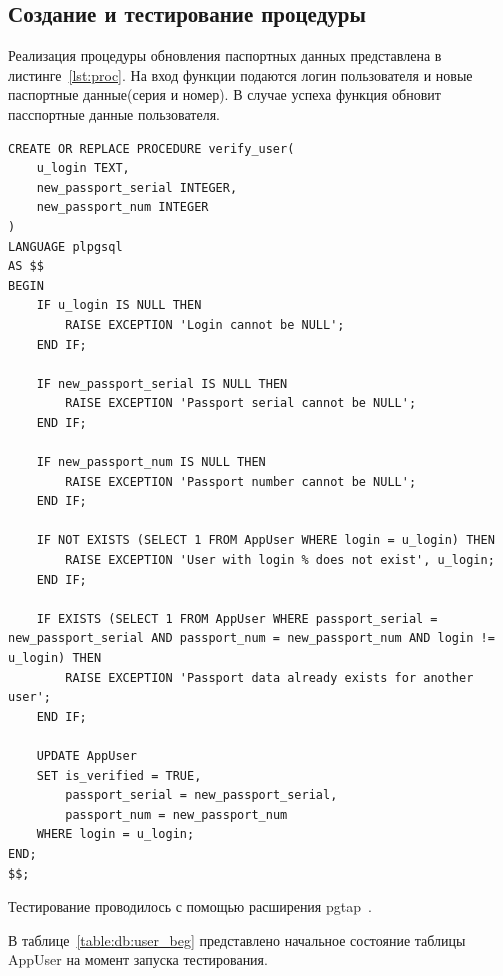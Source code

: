 \subsection{Создание и тестирование процедуры}

Реализация процедуры обновления паспортных данных представлена в листинге~\ref{lst:proc}. На вход функции подаются логин пользователя и новые паспортные данные(серия и номер). В случае успеха функция обновит пасспортные данные пользователя.

\begin{center}
\captionsetup{justification=raggedright,singlelinecheck=off}
\begin{lstlisting}[label=lst:proc, caption=Реализация процедуры обовления паспортных данных]
CREATE OR REPLACE PROCEDURE verify_user(
    u_login TEXT,
    new_passport_serial INTEGER,
    new_passport_num INTEGER
)
LANGUAGE plpgsql
AS $$
BEGIN
    IF u_login IS NULL THEN
        RAISE EXCEPTION 'Login cannot be NULL';
    END IF;
    
    IF new_passport_serial IS NULL THEN
        RAISE EXCEPTION 'Passport serial cannot be NULL';
    END IF;
    
    IF new_passport_num IS NULL THEN
        RAISE EXCEPTION 'Passport number cannot be NULL';
    END IF;

    IF NOT EXISTS (SELECT 1 FROM AppUser WHERE login = u_login) THEN
        RAISE EXCEPTION 'User with login % does not exist', u_login;
    END IF;

    IF EXISTS (SELECT 1 FROM AppUser WHERE passport_serial = new_passport_serial AND passport_num = new_passport_num AND login != u_login) THEN
        RAISE EXCEPTION 'Passport data already exists for another user';
    END IF;

    UPDATE AppUser
    SET is_verified = TRUE,
        passport_serial = new_passport_serial,
        passport_num = new_passport_num
    WHERE login = u_login;
END;
$$;
\end{lstlisting}
\end{center}

Тестирование проводилось с помощью расширения pgtap~\cite{pgtap}.

В таблице~\ref{table:db:user_beg} представлено начальное состояние таблицы AppUser на момент запуска тестирования.

